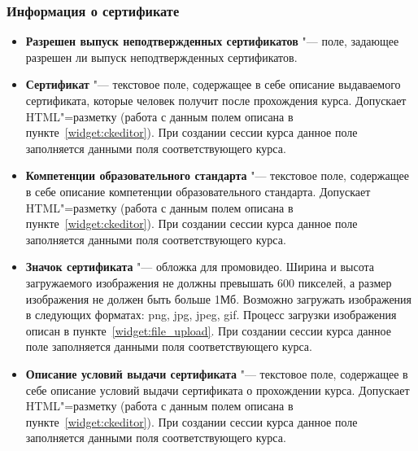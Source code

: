 \subsubsection{Информация о сертификате}
	\begin{itemize}
		\item \textbf{Разрешен выпуск неподтвержденных сертификатов} "--- поле, задающее разрешен ли выпуск неподтвержденных сертификатов.
		
		\item \textbf{Сертификат} "--- текстовое поле, содержащее в себе описание выдаваемого сертификата, которые человек получит после прохождения курса. Допускает HTML"=разметку (работа с данным полем описана в пункте~\ref{widget:ckeditor}). При создании сессии курса данное поле заполняется данными поля  соответствующего курса.
		
		\item \textbf{Компетенции образовательного стандарта} "--- текстовое поле, содержащее в себе описание компетенции образовательного стандарта. Допускает HTML"=разметку (работа с данным полем описана в пункте~\ref{widget:ckeditor}). При создании сессии курса данное поле заполняется данными поля  соответствующего курса.
		
		\item \textbf{Значок сертификата} "--- обложка для промовидео. Ширина и высота загружаемого изображения не должны превышать 600 пикселей, а размер изображения не должен быть больше 1Мб.
		Возможно загружать изображения в следующих форматах: png, jpg, jpeg, gif. Процесс загрузки изображения описан в пункте~\ref{widget:file_upload}. При создании сессии курса данное поле заполняется данными поля  соответствующего курса.
		
		\item \textbf{Описание условий выдачи сертификата} "--- текстовое поле, содержащее в себе описание условий выдачи сертификата о прохождении курса. Допускает HTML"=разметку (работа с данным полем описана в пункте~\ref{widget:ckeditor}). При создании сессии курса данное поле заполняется данными поля  соответствующего курса.
	\end{itemize}
	

